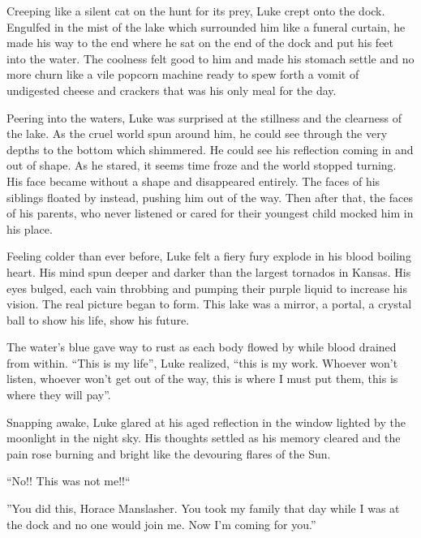 Creeping like a silent cat on the hunt for its prey, Luke crept
onto the dock. Engulfed in the mist of the lake which surrounded
him like a funeral curtain, he made his way to the end where he sat
on the end of the dock and put his feet into the water. The
coolness felt good to him and made his stomach settle and no more
churn like a vile popcorn machine ready to spew forth a vomit of
undigested cheese and crackers that was his only meal for the
day.



Peering into the waters, Luke was surprised at the stillness and
the clearness of the lake. As the cruel world spun around him, he
could see through the very depths to the bottom which shimmered. He
could see his reflection coming in and out of shape. As he stared,
it seems time froze and the world stopped turning. His face became
without a shape and disappeared entirely. The faces of his siblings
floated by instead, pushing him out of the way. Then after that,
the faces of his parents, who never listened or cared for their
youngest child mocked him in his place.



Feeling colder than ever before, Luke felt a fiery fury explode in
his blood boiling heart. His mind spun deeper and darker than the
largest tornados in Kansas. His eyes bulged, each vain throbbing
and pumping their purple liquid to increase his vision. The real
picture began to form. This lake was a mirror, a portal, a crystal
ball to show his life, show his future.



The water's blue gave way to rust as each body flowed by
while blood drained from within. ``This is my life'',
Luke realized, ``this is my work. Whoever won't listen,
whoever won't get out of the way, this is where I must put
them, this is where they will pay''.



Snapping awake, Luke glared at his aged reflection in the window
lighted by the moonlight in the night sky. His thoughts settled as
his memory cleared and the pain rose burning and bright like the
devouring flares of the Sun.

``No!! This was not me!!``



''You did this, Horace Manslasher. You took my family that day while
I was at the dock and no one would join me. Now I'm coming
for you.'' 
 



